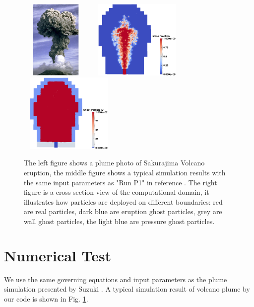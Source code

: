 \begin{figure}[!t]
\centering
\includegraphics[width=3.4cm,height=3.8cm]{Chapter-5/Figures/plume_photo}
\hfil
\includegraphics[width=5.0cm,height=3.8cm]{Chapter-5/Figures/Plume_simulation}
\hfil
\includegraphics[width=4.8cm,height=3.8cm]{Chapter-5/Figures/Boundary-condition}
\caption{The left figure shows a plume photo of Sakurajima Volcano eruption, the middle figure shows a typical simulation results with the same input parameters as "Run P1" in reference \cite{suzuki2005numerical}. The right figure is a cross-section view of the computational domain, it illustrates how particles are deployed on different boundaries: red are real particles, dark blue are eruption ghost particles, grey are wall ghost particles, the light blue are pressure ghost particles.}
\label{fig:Plume}
\end{figure}
\section{Numerical Test}
We use the same governing equations and input parameters as the plume simulation presented by Suzuki \cite{suzuki2005numerical}. %
A typical simulation result of volcano plume by our code is shown in Fig. \ref{fig:Plume}.
%
